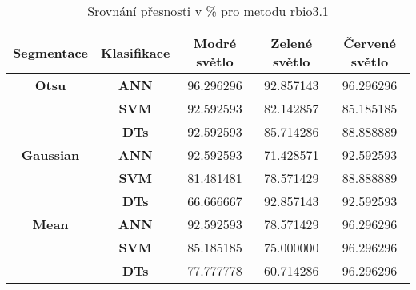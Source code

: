 \capstartfalse
\begin{table}[!htbp]
\centering
\begin{tabular}{|c|c|c|c|c|}
\hline
\textbf{Segmentace} & \textbf{Klasifikace} & \textbf{Modré světlo} & \textbf{Zelené světlo} & \textbf{Červené světlo} \\ \hline
\textbf{Otsu}       & \textbf{ANN}         & 96.296296             & 92.857143              & 96.296296               \\ \hline
\textbf{}           & \textbf{SVM}         & 92.592593             & 82.142857              & 85.185185               \\ \hline
\textbf{}           & \textbf{DTs}         & 92.592593             & 85.714286              & 88.888889               \\ \hline
\textbf{Gaussian}   & \textbf{ANN}         & 92.592593             & 71.428571              & 92.592593               \\ \hline
\textbf{}           & \textbf{SVM}         & 81.481481             & 78.571429              & 88.888889               \\ \hline
\textbf{}           & \textbf{DTs}         & 66.666667             & 92.857143              & 92.592593               \\ \hline
\textbf{Mean}       & \textbf{ANN}         & 92.592593             & 78.571429              & 96.296296               \\ \hline
\textbf{}           & \textbf{SVM}         & 85.185185             & 75.000000              & 96.296296               \\ \hline
\textbf{}           & \textbf{DTs}         & 77.777778             & 60.714286              & 96.296296               \\ \hline
\end{tabular}
\caption{Srovnání přesnosti v \% pro metodu rbio3.1 }
\end{table}
\capstarttrue


